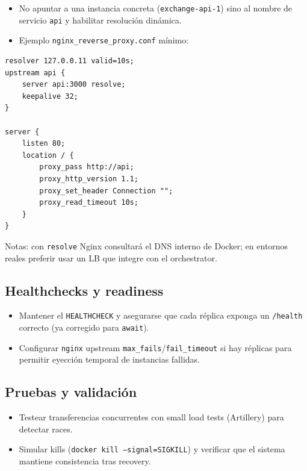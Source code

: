 \begin{itemize}[leftmargin=*]
    \item No apuntar a una instancia concreta (\texttt{exchange-api-1}) sino al nombre de servicio \texttt{api} y habilitar resolución dinámica.
    \item Ejemplo \texttt{nginx\_reverse\_proxy.conf} mínimo:
\end{itemize}

\begin{verbatim}
resolver 127.0.0.11 valid=10s;
upstream api {
    server api:3000 resolve;
    keepalive 32;
}

server {
    listen 80;
    location / {
        proxy_pass http://api;
        proxy_http_version 1.1;
        proxy_set_header Connection "";
        proxy_read_timeout 10s;
    }
}
\end{verbatim}

Notas: con \texttt{resolve} Nginx consultará el DNS interno de Docker; en entornos reales preferir usar un LB que integre con el orchestrator.

\subsection{Healthchecks y readiness}

\begin{itemize}[leftmargin=*]
    \item Mantener el \texttt{HEALTHCHECK} y asegurarse que cada réplica exponga un \texttt{/health} correcto (ya corregido para \texttt{await}).
    \item Configurar \texttt{nginx} upstream \texttt{max\_fails}/\texttt{fail\_timeout} si hay réplicas para permitir eyección temporal de instancias fallidas.
\end{itemize}

\subsection{Pruebas y validación}

\begin{itemize}[leftmargin=*]
    \item Testear transferencias concurrentes con small load tests (Artillery) para detectar races.
    \item Simular kills (\texttt{docker kill --signal=SIGKILL}) y verificar que el sistema mantiene consistencia tras recovery.
\end{itemize}

